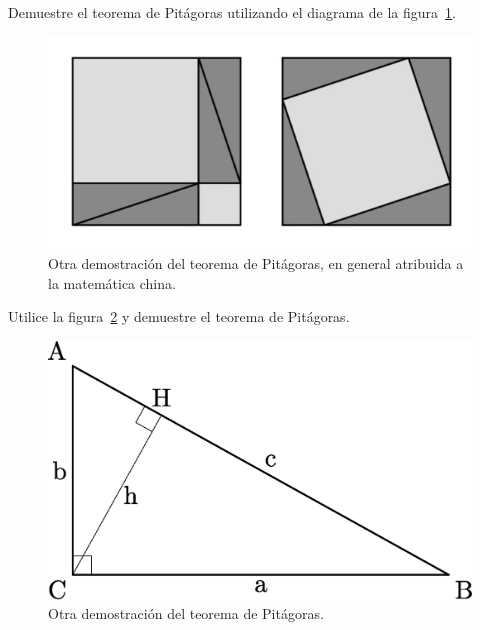 \begin{exercise}
	Demuestre el teorema de Pitágoras utilizando el diagrama de la
	figura~\ref{fig:pitagoras1}.
	\begin{figure}[h]
		\centering
		\includegraphics[scale=.4]{images/pitagoras_proof}
		\caption{Otra demostración del teorema de Pitágoras, en general
		atribuida a la matemática china.}
		\label{fig:pitagoras1}
	\end{figure}
\end{exercise}

\begin{exercise}
	Utilice la figura~\ref{fig:semejanza} y 
	demuestre el teorema de Pitágoras.
	\begin{figure}[h]
		\centering
		\includegraphics[scale=.2]{images/pitagoras_semejanza}
		\caption{Otra demostración del teorema de Pitágoras.}
		\label{fig:semejanza}
	\end{figure}
\end{exercise}

